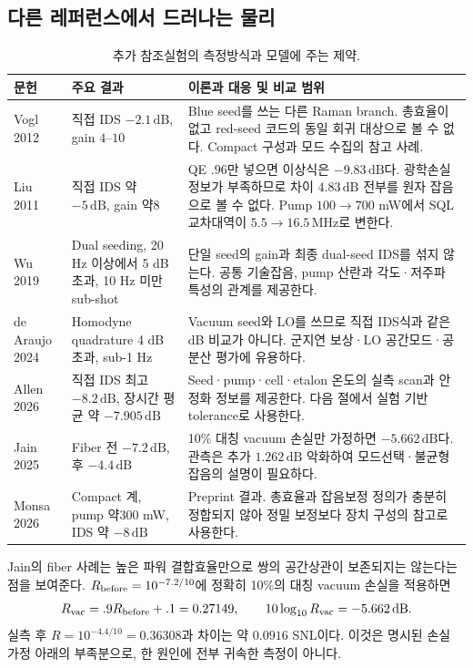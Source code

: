\documentclass[11pt,a4paper]{article}
\newcommand{\dB}{\,\mathrm{dB}}
\newcommand{\MHz}{\,\mathrm{MHz}}
\begin{document}
\subsection{다른 레퍼런스에서 드러나는 물리}
\begin{table}[htbp]\centering\small
\caption{추가 참조실험의 측정방식과 모델에 주는 제약.}\label{tab:others}
\begin{tabularx}{\linewidth}{P{3.05cm}P{3.05cm}Y}
\toprule 문헌 & 주요 결과 & 이론과 대응 및 비교 범위\\\midrule
Vogl 2012\cite{vogl} & 직접 IDS $-2.1\dB$, gain $4$--$10$ &
Blue seed를 쓰는 다른 Raman branch. 총효율이 없고 red-seed 코드의
동일 회귀 대상으로 볼 수 없다. Compact 구성과 모드 수집의 참고 사례.\\
Liu 2011\cite{liu} & 직접 IDS 약 $-5\dB$, gain 약8 &
QE $.96$만 넣으면 이상식은 $-9.83\dB$다. 광학손실 정보가 부족하므로
차이 $4.83\dB$ 전부를 원자 잡음으로 볼 수 없다. Pump $100\to700$ mW에서
SQL 교차대역이 $5.5\to16.5\MHz$로 변한다.\\
Wu 2019\cite{wu} & Dual seeding, 20 Hz 이상에서 5 dB 초과, 10 Hz 미만 sub-shot &
단일 seed의 gain과 최종 dual-seed IDS를 섞지 않는다.
공통 기술잡음, pump 산란과 각도·저주파 특성의 관계를 제공한다.\\
de Araujo 2024\cite{araujo} & Homodyne quadrature 4 dB 초과, sub-1 Hz &
Vacuum seed와 LO를 쓰므로 직접 IDS식과 같은 dB 비교가 아니다.
군지연 보상·LO 공간모드·공분산 평가에 유용하다.\\
Allen 2026\cite{allen} & 직접 IDS 최고 $-8.2\dB$, 장시간 평균 약 $-7.905\dB$ &
Seed·pump·cell·etalon 온도의 실측 scan과 안정화 정보를 제공한다.
다음 절에서 실험 기반 tolerance로 사용한다.\\
Jain 2025\cite{jain} & Fiber 전 $-7.2\dB$, 후 $-4.4\dB$ &
10\% 대칭 vacuum 손실만 가정하면 $-5.662\dB$다.
관측은 추가 $1.262\dB$ 악화하여 모드선택·불균형 잡음의 설명이 필요하다.\\
Monsa 2026\cite{monsa} & Compact 계, pump 약300 mW, IDS 약 $-8\dB$ &
Preprint 결과. 총효율과 잡음보정 정의가 충분히 정합되지 않아
정밀 보정보다 장치 구성의 참고로 사용한다.\\
\bottomrule
\end{tabularx}
\end{table}

Jain의 fiber 사례는 높은 파워 결합효율만으로 쌍의 공간상관이 보존되지는
않는다는 점을 보여준다. $R_{\rm before}=10^{-7.2/10}$에 정확히 10\%의
대칭 vacuum 손실을 적용하면
\begin{equation}
 R_{\rm vac}=.9R_{\rm before}+.1=0.27149,\qquad
 10\log_{10}R_{\rm vac}=-5.662\dB.
\end{equation}
실측 후 $R=10^{-4.4/10}=0.36308$과 차이는 약 $0.0916$ SNL이다.
이것은 명시된 손실 가정 아래의 부족분으로, 한 원인에 전부 귀속한 측정이 아니다.
\end{document}
